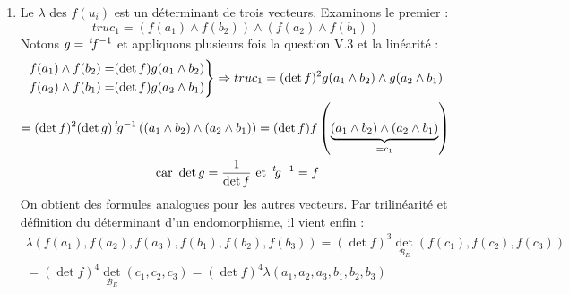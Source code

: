 \begin{enumerate}
\item Le $\lambda$ des $f(u_i)$ est un déterminant de trois vecteurs. Examinons le premier :
\begin{displaymath}
 truc_1 = \left(f(a_1)\wedge f(b_2) \right) \wedge  \left(f(a_2)\wedge f(b_1) \right)
\end{displaymath}
Notons $g=\,\mathstrut^t\! f ^{-1}$ et appliquons plusieurs fois la question V.3 et la linéarité :
\begin{multline*}
 \left.
\begin{aligned}
 f(a_1)\wedge f(b_2) =& (\det f) g(a_1\wedge b_2) \\
 f(a_2)\wedge f(b_1) =& (\det f) g(a_2\wedge b_1)
\end{aligned}
 \right\rbrace 
\Rightarrow 
truc_1 = (\det f)^2 g(a_1\wedge b_2)\wedge g(a_2\wedge b_1)\\ 
= (\det f)^2 (\det g) \,\mathstrut^t\! g ^{-1}\left( (a_1\wedge b_2 )\wedge (a_2 \wedge b_1) \right) 
= (\det f) f\left( \underset{=c_1}{\underbrace{(a_1\wedge b_2 )\wedge (a_2\wedge b_1)}} \right) \\ \text{ car } \det g = \frac{1}{\det f} \text{ et } \,\mathstrut^t\! g ^{-1}=f
\end{multline*}
On obtient des formules analogues pour les autres vecteurs. Par trilinéarité et définition du déterminant d'un endomorphisme, il vient enfin :
\begin{multline*}
 \lambda\left(f(a_1),f(a_2),f(a_3),f(b_1),f(b_2),f(b_3)\right)= (\det f)^3 \det_{\mathcal B_E}(f(c_1),f(c_2),f(c_3))\\
 = (\det f)^4 \det_{\mathcal B_E}(c_1,c_2,c_3)=(\det f)^4\lambda\left(a_1,a_2,a_3,b_1,b_2,b_3\right)
\end{multline*}


\end{enumerate}
